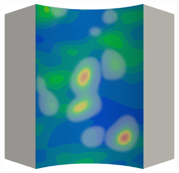\begin{frame}
\begin{columns}[T]
\begin{column}{0.6\textwidth}
\begin{figure}
{\begin{subfigure}{0.19\textwidth}
          \end{subfigure}
          \hspace{0.06\textwidth}
          \begin{subfigure}{0.19\textwidth}
            \centering
            \includegraphics[width=\textwidth]{examples/figures/ep.0012}
          \end{subfigure}
        }
        

\end{figure}
\end{column}
\end{columns}
\end{frame}
